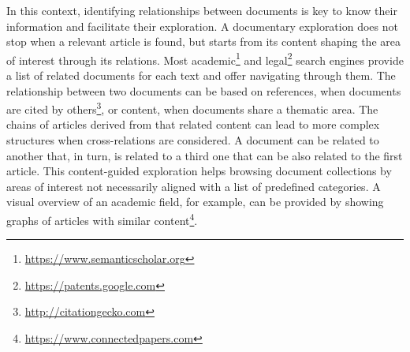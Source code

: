 In this context, identifying relationships between documents is key to know their information and facilitate their exploration. A documentary exploration does not stop when a relevant article is found, but starts from its content shaping the area of interest through its relations. Most academic\footnote{\url{https://www.semanticscholar.org}} and legal\footnote{\url{https://patents.google.com}} search engines provide a list of related documents for each text and offer navigating through them. The relationship between two documents can be based on references, when documents are cited by others\footnote{\url{http://citationgecko.com}}, or content, when documents share a thematic area. The chains of articles derived from that related content can lead to more complex structures when cross-relations are considered. A document can be related to another that, in turn, is related to a third one that can be also related to the first article. This content-guided exploration helps browsing document collections by areas of interest not necessarily aligned with a list of predefined categories. A visual overview of an academic field, for example, can be provided by showing graphs of articles with similar content\footnote{\url{https://www.connectedpapers.com}}.

